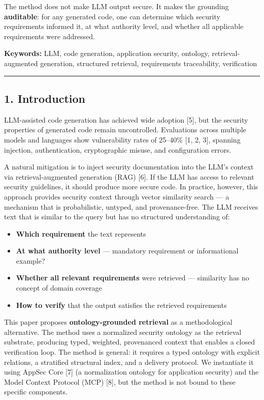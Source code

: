 \documentclass[
]{article}
\providecommand{\tightlist}{%
  \setlength{\itemsep}{0pt}\setlength{\parskip}{0pt}}
\begin{document}
The method does not make LLM output secure. It makes the grounding
\textbf{auditable}: for any generated code, one can determine which
security requirements informed it, at what authority level, and whether
all applicable requirements were addressed.

\textbf{Keywords:} LLM, code generation, application security, ontology,
retrieval-augmented generation, structured retrieval, requirements
traceability, verification

\begin{center}\rule{0.5\linewidth}{0.5pt}\end{center}

\subsection{1. Introduction}\label{introduction}

LLM-assisted code generation has achieved wide adoption {[}5{]}, but the
security properties of generated code remain uncontrolled. Evaluations
across multiple models and languages show vulnerability rates of
25--40\% {[}1, 2, 3{]}, spanning injection, authentication,
cryptographic misuse, and configuration errors.

A natural mitigation is to inject security documentation into the LLM's
context via retrieval-augmented generation (RAG) {[}6{]}. If the LLM has
access to relevant security guidelines, it should produce more secure
code. In practice, however, this approach provides security context
through vector similarity search --- a mechanism that is probabilistic,
untyped, and provenance-free. The LLM receives text that is similar to
the query but has no structured understanding of:

\begin{itemize}
\tightlist
\item
  \textbf{Which requirement} the text represents
\item
  \textbf{At what authority level} --- mandatory requirement or
  informational example?
\item
  \textbf{Whether all relevant requirements} were retrieved ---
  similarity has no concept of domain coverage
\item
  \textbf{How to verify} that the output satisfies the retrieved
  requirements
\end{itemize}

This paper proposes \textbf{ontology-grounded retrieval} as a
methodological alternative. The method uses a normalized security
ontology as the retrieval substrate, producing typed, weighted,
provenanced context that enables a closed verification loop. The method
is general: it requires a typed ontology with explicit relations, a
stratified structural index, and a delivery protocol. We instantiate it
using AppSec Core {[}7{]} (a normalization ontology for application
security) and the Model Context Protocol (MCP) {[}8{]}, but the method
is not bound to these specific components.
\end{document}
